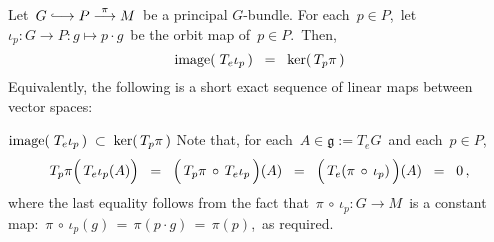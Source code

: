 
\vskip 0.5cm
\begin{proposition}
\mbox{}
\vskip 0.1cm
\noindent
Let \,$G \longhookrightarrow P \overset{\pi}{\longrightarrow} M$\, be a principal $G$-bundle.
For each \,$p \in P$,\, let \,$\iota_{p} : G \longrightarrow P : g \longmapsto p \cdot g$\, be the orbit map of \,$p \in P$.\,
Then,
\begin{equation*}
\textnormal{image}\!\left(\;T_{e}\iota_{p}\,\right) \;\; = \;\; \ker\!\left(\,T_{p}\pi\,\right)
\end{equation*}
Equivalently, the following is a short exact sequence of linear maps between vector spaces:
\begin{center}
\end{center}
\end{proposition}
\proof
\vskip 0.3cm
\noindent
\underline{$\textnormal{image}\!\left(\;T_{e}\iota_{p}\,\right) \;\subset\; \ker\!\left(\,T_{p}\pi\,\right)$}
\vskip 0.2cm
\noindent
Note that, for each \,$A \in \mathfrak{g} := T_{e}G$\, and each \,$p \in P$,\,
\begin{equation*}
T_{p}\pi\!\left(\,T_{e}\iota_{p}(\overset{{\color{white}.}}{A})\right)
\;\; = \;\;
	\left(\,T_{p}\pi \,\overset{{\color{white}1}}{\circ}\, T_{e}\iota_{p}\,\right)\!(A)
\;\; = \;\;
	\left(\,T_{e}(\pi\,\overset{{\color{white}1}}{\circ}\,\iota_{p})\,\right)\!(A)
\;\; = \;\;
	0\,,
\end{equation*}
where the last equality follows from the fact that
\,$\pi\,\circ\,\iota_{p} : G \longrightarrow M$\,
is a constant map:
\,$\pi\,\circ\,\iota_{p}(g) \,=\, \pi(p \cdot g) \,=\, \pi(p)$,\,
as required.

